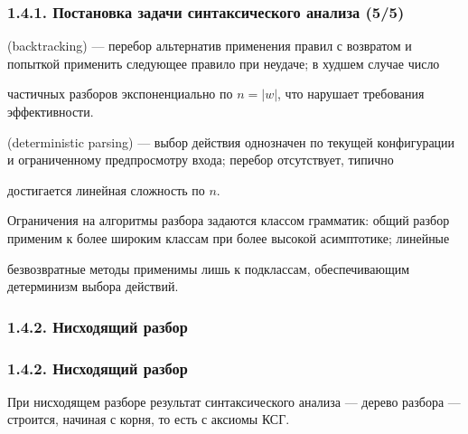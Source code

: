\begin{frame}
	\frametitle{1.4.1. Постановка задачи синтаксического анализа (5/5)}
	 (backtracking) --- перебор альтернатив применения правил с возвратом и попыткой применить следующее правило при неудаче; в худшем случае число 
    
    частичных разборов экспоненциально по $n=|w|$, что нарушает требования эффективности.
	
	\medskip
	
	 (deterministic parsing) --- выбор действия однозначен по текущей конфигурации и ограниченному предпросмотру входа; перебор отсутствует, типично
    
    достигается линейная сложность по $n$.
	
	\begin{remark}
		Ограничения на алгоритмы разбора задаются классом грамматик: общий разбор применим к более широким классам при более высокой асимптотике; линейные
        
        безвозвратные методы применимы лишь к подклассам, обеспечивающим детерминизм выбора действий.
	\end{remark}
	
\bigskip
{}	
	
\end{frame}

\subsubsection{1.4.2. Нисходящий разбор}
\begin{frame}
\frametitle{1.4.2. Нисходящий разбор}

При нисходящем разборе результат синтаксического анализа 
--- дерево разбора --- строится, начиная с корня, то есть с аксиомы КСГ.

\medskip 
{}

{}
\end{frame}

